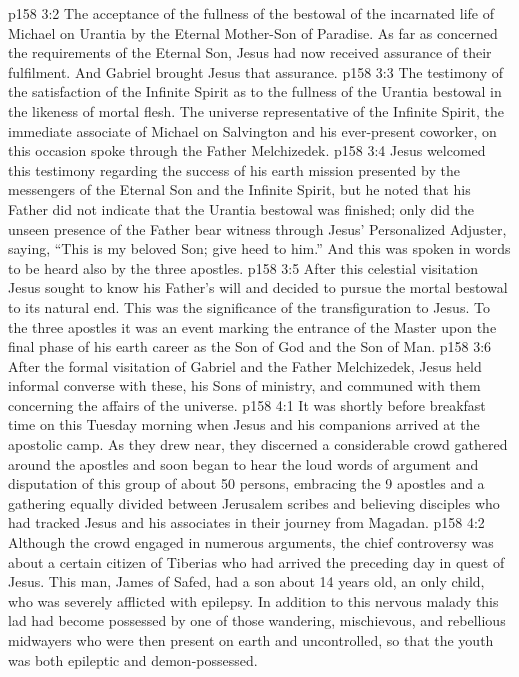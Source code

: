 \vs p158 3:2 \bibnobreakspace The acceptance of the fullness of the bestowal of the incarnated life of Michael on Urantia by the Eternal Mother\hyp{}Son of Paradise. As far as concerned the requirements of the Eternal Son, Jesus had now received assurance of their fulfilment. And Gabriel brought Jesus that assurance.
\vs p158 3:3 \bibnobreakspace The testimony of the satisfaction of the Infinite Spirit as to the fullness of the Urantia bestowal in the likeness of mortal flesh. The universe representative of the Infinite Spirit, the immediate associate of Michael on Salvington and his ever\hyp{}present coworker, on this occasion spoke through the Father Melchizedek.
\vs p158 3:4 \pc Jesus welcomed this testimony regarding the success of his earth mission presented by the messengers of the Eternal Son and the Infinite Spirit, but he noted that his Father did not indicate that the Urantia bestowal was finished; only did the unseen presence of the Father bear witness through Jesus’ Personalized Adjuster, saying, “This is my beloved Son; give heed to him.” And this was spoken in words to be heard also by the three apostles.
\vs p158 3:5 After this celestial visitation Jesus sought to know his Father’s will and decided to pursue the mortal bestowal to its natural end. This was the significance of the transfiguration to Jesus. To the three apostles it was an event marking the entrance of the Master upon the final phase of his earth career as the Son of God and the Son of Man.
\vs p158 3:6 After the formal visitation of Gabriel and the Father Melchizedek, Jesus held informal converse with these, his Sons of ministry, and communed with them concerning the affairs of the universe.
\vs p158 4:1 It was shortly before breakfast time on this Tuesday morning when Jesus and his companions arrived at the apostolic camp. As they drew near, they discerned a considerable crowd gathered around the apostles and soon began to hear the loud words of argument and disputation of this group of about 50 persons, embracing the 9 apostles and a gathering equally divided between Jerusalem scribes and believing disciples who had tracked Jesus and his associates in their journey from Magadan.
\vs p158 4:2 Although the crowd engaged in numerous arguments, the chief controversy was about a certain citizen of Tiberias who had arrived the preceding day in quest of Jesus. This man, James of Safed, had a son about 14 years old, an only child, who was severely afflicted with epilepsy. In addition to this nervous malady this lad had become possessed by one of those wandering, mischievous, and rebellious midwayers who were then present on earth and uncontrolled, so that the youth was both epileptic and demon\hyp{}possessed.

